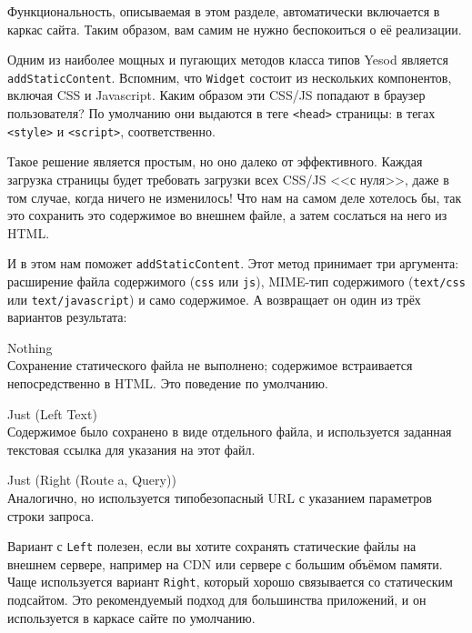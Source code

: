 \begin{remark}
    Функциональность, описываемая в этом разделе, автоматически включается в
    каркас сайта. Таким образом, вам самим не нужно беспокоиться о её
    реализации.
\end{remark}

Одним из наиболее мощных и пугающих методов класса типов Yesod является
\lstinline!addStaticContent!. Вспомним, что \lstinline!Widget! состоит из
нескольких компонентов, включая CSS и Javascript. Каким образом эти CSS/JS
попадают в браузер пользователя? По умолчанию они выдаются в теге
\lstinline!<head>! страницы: в тегах \lstinline!<style>! и
\lstinline!<script>!, соответственно.

Такое решение является простым, но оно далеко от эффективного. Каждая загрузка
страницы будет требовать загрузки всех CSS/JS <<с нуля>>, даже в том случае,
когда ничего не изменилось! Что нам на самом деле хотелось бы, так это
сохранить это содержимое во внешнем файле, а затем сослаться на него из HTML.

И в этом нам поможет \lstinline!addStaticContent!. Этот метод принимает три
аргумента: расширение файла содержимого (\lstinline!css! или \lstinline!js!),
MIME-тип содержимого (\lstinline!text/css! или \lstinline!text/javascript!) и
само содержимое. А возвращает он один из трёх вариантов результата:

\begin{description}
  \item {Nothing}  \hfill \\
    Сохранение статического файла не выполнено; содержимое встраивается
    непосредственно в HTML. Это поведение по умолчанию.

  \item {Just (Left Text)} \hfill \\
    Содержимое было сохранено в виде отдельного файла, и используется заданная
    текстовая ссылка для указания на этот файл.

  \item {Just (Right (Route a, Query))} \hfill \\
    Аналогично, но используется типобезопасный URL с указанием параметров
    строки запроса.
\end{description}

Вариант с \lstinline!Left! полезен, если вы хотите сохранять статические файлы
на внешнем сервере, например на CDN или сервере с большим объёмом памяти. Чаще
используется вариант \lstinline!Right!, который хорошо связывается со
статическим подсайтом. Это рекомендуемый подход для большинства приложений, и
он используется в каркасе сайте по умолчанию.

